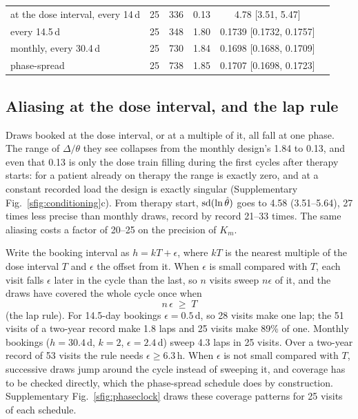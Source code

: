 \begin{table}[htbp]
\begin{tabular}{@{}lrlccr@{}}
\midrule
at the dose interval, every 14\,d & 25 & 336 & 0.13 & 4.78 [3.51, 5.47] & \\
every 14.5\,d & 25 & 348 & 1.80 & 0.1739 [0.1732, 0.1757] & \\
monthly, every 30.4\,d & 25 & 730 & 1.84 & 0.1698 [0.1688, 0.1709] & \\
phase-spread & 25 & 738 & 1.85 & 0.1707 [0.1698, 0.1723] & \\
\bottomrule
\end{tabular}
\end{table}

\subsection{Aliasing at the dose interval, and the lap rule}
\label{si:s2:aliasing}

Draws booked at the dose interval, or at a multiple of it, all fall at one phase. The range of
$\Delta/\theta$ they see collapses from the monthly design's 1.84 to 0.13, and even that 0.13 is
only the dose train filling during the first cycles after therapy starts: for a patient already on
therapy the range is exactly zero, and at a constant recorded load the design is exactly singular
(Supplementary Fig.~\ref{sfig:conditioning}c). From therapy start, $\operatorname{sd}(\ln \hat\theta)$ goes to 4.58
(3.51--5.64), 27 times less precise than monthly draws, record by record 21--33 times. The same
aliasing costs a factor of 20--25 on the precision of $K_m$.

Write the booking interval as $h=kT+\epsilon$, where $kT$ is the nearest multiple of the dose
interval $T$ and $\epsilon$ the offset from it. When $\epsilon$ is small compared with $T$, each
visit falls $\epsilon$ later in the cycle than the last, so $n$ visits sweep $n\epsilon$ of it,
and the draws have covered the whole cycle once when
\begin{equation}
\label{seq:lap}
n\,\epsilon\;\ge\;T
\end{equation}
(the lap rule). For 14.5-day bookings $\epsilon=0.5$\,d, so 28 visits make one lap; the 51 visits
of a two-year record make 1.8 laps and 25 visits make 89\% of one. Monthly bookings ($h=30.4$\,d,
$k=2$, $\epsilon=2.4$\,d) sweep 4.3 laps in 25 visits. Over a two-year record of 53 visits the
rule needs $\epsilon\ge6.3$\,h. When $\epsilon$ is not small compared with $T$, successive draws
jump around the cycle instead of sweeping it, and coverage has to be checked directly, which the
phase-spread schedule does by construction.
Supplementary Fig.~\ref{sfig:phaseclock} draws these coverage patterns for 25 visits of each
schedule.

